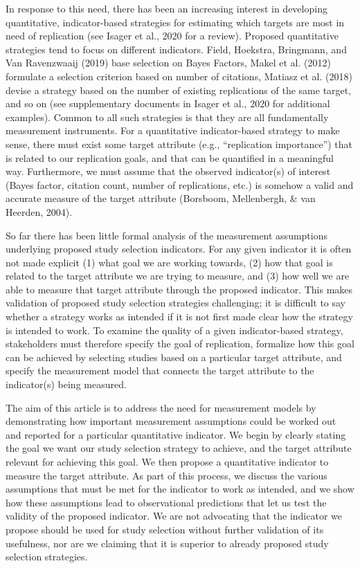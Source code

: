 \documentclass[
  english,
  jou,floatsintext]{apa6}
\begin{document}
In response to this need, there has been an increasing interest in developing quantitative, indicator-based strategies for estimating which targets are most in need of replication (see Isager et al., 2020 for a review). Proposed quantitative strategies tend to focus on different indicators. Field, Hoekstra, Bringmann, and Van Ravenzwaaij (2019) base selection on Bayes Factors, Makel et al. (2012) formulate a selection criterion based on number of citations, Matiasz et al. (2018) devise a strategy based on the number of existing replications of the same target, and so on (see supplementary documents in Isager et al., 2020 for additional examples). Common to all such strategies is that they are all fundamentally measurement instruments. For a quantitative indicator-based strategy to make sense, there must exist some target attribute (e.g., ``replication importance'') that is related to our replication goals, and that can be quantified in a meaningful way. Furthermore, we must assume that the observed indicator(s) of interest (Bayes factor, citation count, number of replications, etc.) is somehow a valid and accurate measure of the target attribute (Borsboom, Mellenbergh, \& van Heerden, 2004).

So far there has been little formal analysis of the measurement assumptions underlying proposed study selection indicators. For any given indicator it is often not made explicit (1) what goal we are working towards, (2) how that goal is related to the target attribute we are trying to measure, and (3) how well we are able to measure that target attribute through the proposed indicator. This makes validation of proposed study selection strategies challenging; it is difficult to say whether a strategy works as intended if it is not first made clear how the strategy is intended to work. To examine the quality of a given indicator-based strategy, stakeholders must therefore specify the goal of replication, formalize how this goal can be achieved by selecting studies based on a particular target attribute, and specify the measurement model that connects the target attribute to the indicator(s) being measured.

The aim of this article is to address the need for measurement models by demonstrating how important measurement assumptions could be worked out and reported for a particular quantitative indicator. We begin by clearly stating the goal we want our study selection strategy to achieve, and the target attribute relevant for achieving this goal. We then propose a quantitative indicator to measure the target attribute. As part of this process, we discuss the various assumptions that must be met for the indicator to work as intended, and we show how these assumptions lead to observational predictions that let us test the validity of the proposed indicator. We are not advocating that the indicator we propose should be used for study selection without further validation of its usefulness, nor are we claiming that it is superior to already proposed study selection strategies.
\end{document}
